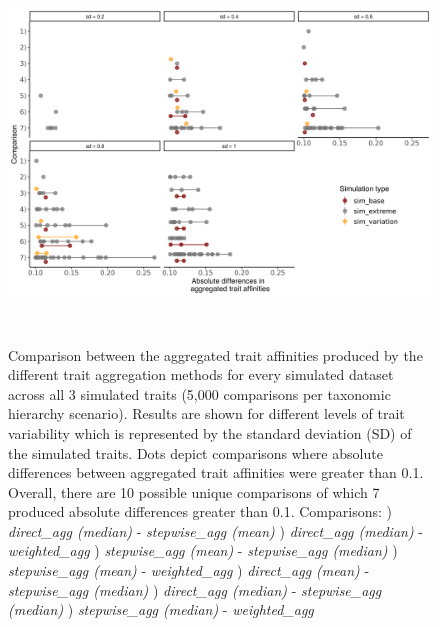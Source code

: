 \documentclass{article}
\begin{document}
\begin{figure}[H]
  \centering
  \includegraphics[width=16.5cm, height=10cm]{Diffs_indiv_runs_sim.png}
  \caption{Comparison between the aggregated trait affinities produced by the different trait aggregation methods for every simulated dataset across all 3 simulated traits (5,000 comparisons per taxonomic hierarchy scenario). Results are shown for different levels of trait variability which is represented by the standard deviation (SD) of the simulated traits. Dots depict comparisons where absolute differences between aggregated trait affinities were greater than 0.1. Overall, there are 10 possible unique comparisons of which 7 produced absolute differences greater than 0.1. \newline
  Comparisons: ) \textit{direct\_agg (median)} - \textit{stepwise\_agg (mean)} ) \textit{direct\_agg (median)} - \textit{weighted\_agg} ) \textit{stepwise\_agg (mean)} - \textit{stepwise\_agg (median)} ) \textit{stepwise\_agg (mean)} - \textit{weighted\_agg} ) \textit{direct\_agg (mean)} - \textit{stepwise\_agg (median)} ) \textit{direct\_agg (median)} - \textit{stepwise\_agg (median)} ) \textit{stepwise\_agg (median)} - \textit{weighted\_agg} \newline
  }
  \label{fig:sim_indv_runs}
\end{figure}
\end{document}
